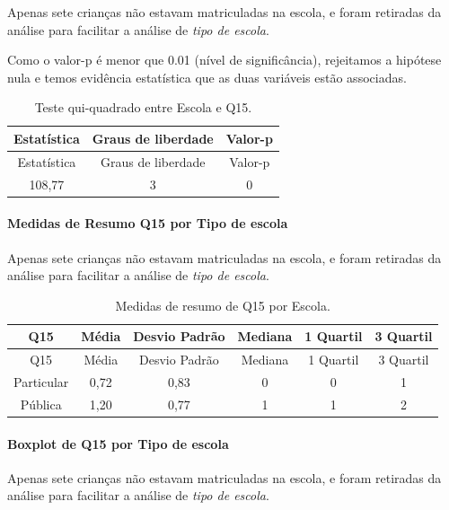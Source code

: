 \documentclass[]{article}
\let\oldparagraph\paragraph
\renewcommand{\paragraph}[1]{\oldparagraph{#1}\mbox{}}
\begin{document}
Apenas sete crianças não estavam matriculadas na escola, e foram retiradas da análise para facilitar a análise de \emph{tipo de escola}.

Como o valor-p é menor que 0.01 (nível de significância), rejeitamos a hipótese nula e temos evidência estatística que as duas variáveis estão associadas.

\begin{longtable}[]{@{}ccc@{}}
\caption{\label{tab:unnamed-chunk-115}Teste qui-quadrado entre Escola e Q15.}\tabularnewline
\toprule
Estatística & Graus de liberdade & Valor-p\tabularnewline
\midrule
\endfirsthead
\toprule
Estatística & Graus de liberdade & Valor-p\tabularnewline
\midrule
\endhead
108,77 & 3 & 0\tabularnewline
\bottomrule
\end{longtable}

\cleardoublepage

\hypertarget{medidas-de-resumo-q15-por-tipo-de-escola}{%
\paragraph{Medidas de Resumo Q15 por Tipo de escola}\label{medidas-de-resumo-q15-por-tipo-de-escola}}

Apenas sete crianças não estavam matriculadas na escola, e foram retiradas da análise para facilitar a análise de \emph{tipo de escola}.

\begin{longtable}[]{@{}cccccc@{}}
\caption{\label{tab:unnamed-chunk-116}Medidas de resumo de Q15 por Escola.}\tabularnewline
\toprule
Q15 & Média & Desvio Padrão & Mediana & 1 Quartil & 3 Quartil\tabularnewline
\midrule
\endfirsthead
\toprule
Q15 & Média & Desvio Padrão & Mediana & 1 Quartil & 3 Quartil\tabularnewline
\midrule
\endhead
Particular & 0,72 & 0,83 & 0 & 0 & 1\tabularnewline
Pública & 1,20 & 0,77 & 1 & 1 & 2\tabularnewline
\bottomrule
\end{longtable}

\hypertarget{boxplot-de-q15-por-tipo-de-escola}{%
\paragraph{Boxplot de Q15 por Tipo de escola}\label{boxplot-de-q15-por-tipo-de-escola}}

Apenas sete crianças não estavam matriculadas na escola, e foram retiradas da análise para facilitar a análise de \emph{tipo de escola}.
\end{document}
